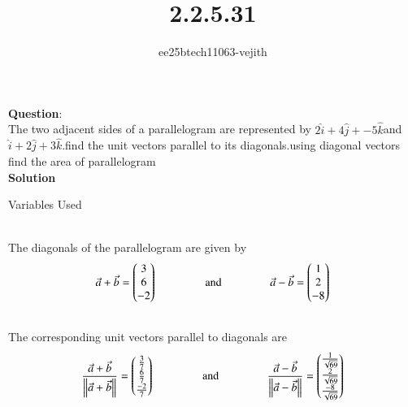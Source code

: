 \documentclass[journal]{IEEEtran}
\begin{document}

\vspace{3cm}

\title{2.2.5.31}
\author{ee25btech11063-vejith}

\maketitle
{\let\newpage\relax\maketitle}
\renewcommand{\thefigure}{\theenumi}
\renewcommand{\thetable}{\theenumi}
\setlength{\intextsep}{10pt} %
\textbf{Question}:\\
The two adjacent sides of a parallelogram are represented by $2\hat{i} + 4\hat{j} + -5\hat{k}$\hspace{0.3cm}and\hspace{0.3cm}$\hat{i} + 2\hat{j} + 3\hat{k}$.find the unit vectors parallel  to its diagonals.using diagonal vectors find the area of parallelogram\\
\textbf{Solution}\\
 \begin{table}[h!]    
  \centering
  
  \caption{Variables Used}
  \label{}
\end{table}\\
The diagonals of the parallelogram are given by \\
\begin{align}
    \Vec{a}+\Vec{b}=\begin{pmatrix}3\\6\\-2\end{pmatrix} \hspace{1.5cm} \text{and}\hspace{1.5cm} \Vec{a}-\Vec{b}=\begin{pmatrix}1\\2\\-8\end{pmatrix}\\
    \notag
    \end{align}
 The corresponding unit vectors parallel to diagonals are\\
 \begin{align}
 \frac{\Vec{a}+\Vec{b}}{\left\lVert\Vec{a}+\Vec{b}\right\rVert}=\begin{pmatrix}\frac{3}{7}\\ \frac{6}{7}\\\frac{-2}{7}\end{pmatrix}\hspace{1.5cm} \text{and}\hspace{1.5cm} \frac{\Vec{a}-\Vec{b}}{\left\lVert\Vec{a}-\Vec{b}\right\rVert}=\begin{pmatrix}\frac{1}{\sqrt{69}}\\ \frac{2}{\sqrt{69}}\\\frac{-8}{\sqrt{69}}\end{pmatrix}\\
 \notag
 \end{align}
\end{document}
